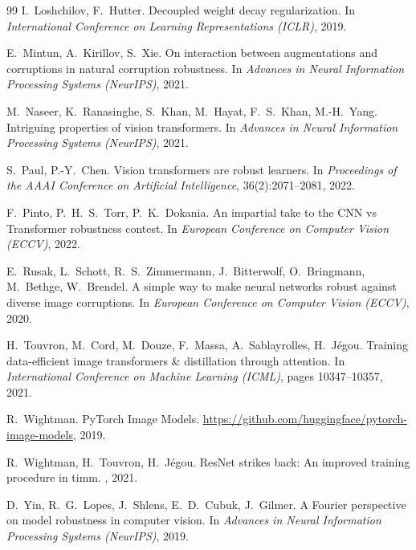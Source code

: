 \documentclass[a4paper,11pt]{article}
\begin{document}
\begin{thebibliography}{99}
I.~Loshchilov, F.~Hutter.
\newblock Decoupled weight decay regularization.
\newblock In {\em International Conference on Learning Representations (ICLR)}, 2019.

E.~Mintun, A.~Kirillov, S.~Xie.
\newblock On interaction between augmentations and corruptions in natural corruption robustness.
\newblock In {\em Advances in Neural Information Processing Systems (NeurIPS)}, 2021.

M.~Naseer, K.~Ranasinghe, S.~Khan, M.~Hayat, F.~S.~Khan, M.-H.~Yang.
\newblock Intriguing properties of vision transformers.
\newblock In {\em Advances in Neural Information Processing Systems (NeurIPS)}, 2021.

S.~Paul, P.-Y.~Chen.
\newblock Vision transformers are robust learners.
\newblock In {\em Proceedings of the AAAI Conference on Artificial Intelligence}, 36(2):2071--2081, 2022.

F.~Pinto, P.~H.~S.~Torr, P.~K.~Dokania.
\newblock An impartial take to the CNN vs Transformer robustness contest.
\newblock In {\em European Conference on Computer Vision (ECCV)}, 2022.

E.~Rusak, L.~Schott, R.~S.~Zimmermann, J.~Bitterwolf, O.~Bringmann, M.~Bethge, W.~Brendel.
\newblock A simple way to make neural networks robust against diverse image corruptions.
\newblock In {\em European Conference on Computer Vision (ECCV)}, 2020.

H.~Touvron, M.~Cord, M.~Douze, F.~Massa, A.~Sablayrolles, H.~J\'egou.
\newblock Training data-efficient image transformers \& distillation through attention.
\newblock In {\em International Conference on Machine Learning (ICML)}, pages 10347--10357, 2021.

R.~Wightman.
\newblock PyTorch Image Models.
\newblock \url{https://github.com/huggingface/pytorch-image-models}, 2019.

R.~Wightman, H.~Touvron, H.~J\'egou.
\newblock ResNet strikes back: An improved training procedure in timm.
, 2021.

D.~Yin, R.~G.~Lopes, J.~Shlens, E.~D.~Cubuk, J.~Gilmer.
\newblock A Fourier perspective on model robustness in computer vision.
\newblock In {\em Advances in Neural Information Processing Systems (NeurIPS)}, 2019.

\end{thebibliography}
\end{document}
